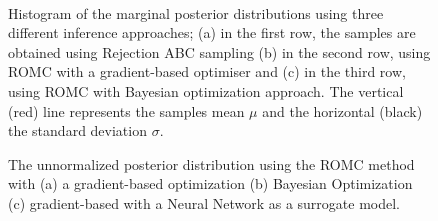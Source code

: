 \begin{figure}[ht]
  \begin{center}
    \resizebox{.24\columnwidth}{!}{%
      
    }
    \resizebox{.24\columnwidth}{!}{%
      
    }
    \resizebox{.24\columnwidth}{!}{%
      
    }
    \resizebox{.24\columnwidth}{!}{%
      
    }\\
    \resizebox{.24\columnwidth}{!}{%
      
    }
    \resizebox{.24\columnwidth}{!}{%
      
    }
    \resizebox{.24\columnwidth}{!}{%
      
    }
    \resizebox{.24\columnwidth}{!}{%
      
    }
    \end{center}
    \caption[MA2 example, evaluation of the marginal
    distributions.]{Histogram of the marginal posterior distributions
      using three different inference approaches; (a) in the first
      row, the samples are obtained using Rejection ABC sampling (b)
      in the second row, using ROMC with a gradient-based optimiser
      and (c) in the third row, using ROMC with Bayesian optimization
      approach. The vertical (red) line represents the samples mean
      \(\mu\) and the horizontal (black) the standard deviation
      \(\sigma\).}
  \label{fig:ma2_3}
\end{figure}

\begin{figure}[ht]
  \begin{center}
    \resizebox{.32\columnwidth}{!}{%
      
    }
    \resizebox{.32\columnwidth}{!}{%
      
    }
    \resizebox{.32\columnwidth}{!}{%
      
    }
    \end{center}
    \caption[MA2 example, posterior distribution.]{The unnormalized posterior distribution using the ROMC method with (a) a gradient-based optimization (b) Bayesian Optimization (c) gradient-based with a Neural Network as a surrogate model.}
  \label{fig:ma2_4}
\end{figure}



